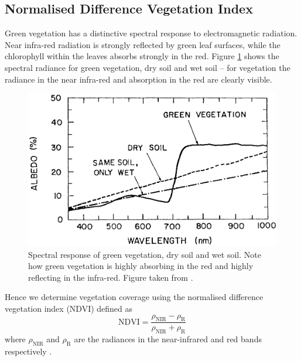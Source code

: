 \subsection{Normalised Difference Vegetation Index}
\label{sec:intro:ndvi}
Green vegetation has a distinctive spectral response to electromagnetic
radiation. Near infra-red radiation is strongly reflected by green leaf
surfaces, while the chlorophyll within the leaves absorbs strongly in the
red. Figure \ref{fig:leaf_spec} shows the spectral radiance for green
vegetation, dry soil and wet soil -- for vegetation the radiance in the near
infra-red and absorption in the red are clearly visible.
\begin{figure}
  \centering
  \includegraphics[width=0.9\linewidth]{figures/leaf_spec}
  \caption{Spectral response of green vegetation, dry soil and wet soil. Note how green vegetation is highly absorbing in the red and highly reflecting in the infra-red. Figure taken from \cite{tucker1977}.}
  \label{fig:leaf_spec}
\end{figure}
Hence we determine vegetation coverage using the normalised difference
vegetation index (NDVI) defined as
\begin{equation}
  \mathrm{NDVI} = \frac{\rho_{\mathrm{NIR}}-\rho_{\mathrm{R}}}{\rho_{\mathrm{NIR}}+\rho_{\mathrm{R}}}
  \label{eq:ndvi}
\end{equation}
where $\rho_{\mathrm{NIR}}$ and $\rho_{\mathrm{R}}$ are the radiances in the
near-infrared and red bands respectively \citep{tucker1979}.

